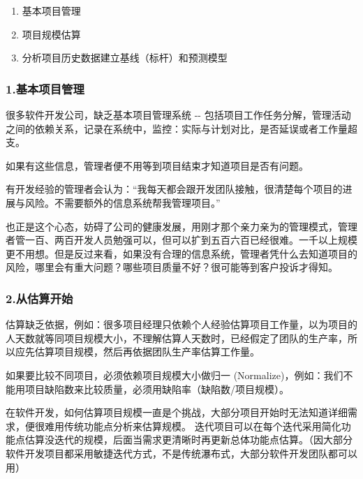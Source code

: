 \begin{enumerate}
\tightlist
\item
  基本项目管理
\item
  项目规模估算
\item
  分析项目历史数据建立基线（标杆）和预测模型
\end{enumerate}

\hypertarget{ux57faux672cux9879ux76eeux7ba1ux7406}{%
\subsubsection{1.基本项目管理}\label{ux57faux672cux9879ux76eeux7ba1ux7406}}

很多软件开发公司，缺乏基本项目管理系统 -\/-
包括项目工作任务分解，管理活动之间的依赖关系，记录在系统中，监控：实际与计划对比，是否延误或者工作量超支。

如果有这些信息，管理者便不用等到项目结束才知道项目是否有问题。

有开发经验的管理者会认为：``我每天都会跟开发团队接触，很清楚每个项目的进展与风险。不需要额外的信息系统帮我管理项目。''

也正是这个心态，妨碍了公司的健康发展，用刚才那个亲力亲为的管理模式，管理者管一百、两百开发人员勉强可以，但可以扩到五百六百已经很难。一千以上规模更不用想。但是反过来看，如果没有合理的信息系统，管理者凭什么去知道项目的风险，哪里会有重大问题？哪些项目质量不好？很可能等到客户投诉才得知。

\hypertarget{ux4eceux4f30ux7b97ux5f00ux59cb}{%
\subsubsection{2.从估算开始}\label{ux4eceux4f30ux7b97ux5f00ux59cb}}

估算缺乏依据，例如：很多项目经理只依赖个人经验估算项目工作量，以为项目的人天数就等同项目规模大小，不理解估算人天数时，已经假定了团队的生产率，所以应先估算项目规模，然后再依据团队生产率估算工作量。

如果要比较不同项目，必须依赖项目规模大小做归一
(Normalize)，例如：我们不能用项目缺陷数来比较质量，必须用缺陷率（缺陷数/项目规模）。

在软件开发，如何估算项目规模一直是个挑战，大部分项目开始时无法知道详细需求，便很难用传统功能点分析来估算规模。
迭代项目可以在每个迭代采用简化功能点估算没迭代的规模，后面当需求更清晰时再更新总体功能点估算。（因大部分软件开发项目都采用敏捷迭代方式，不是传统瀑布式，大部分软件开发团队都可以用）



